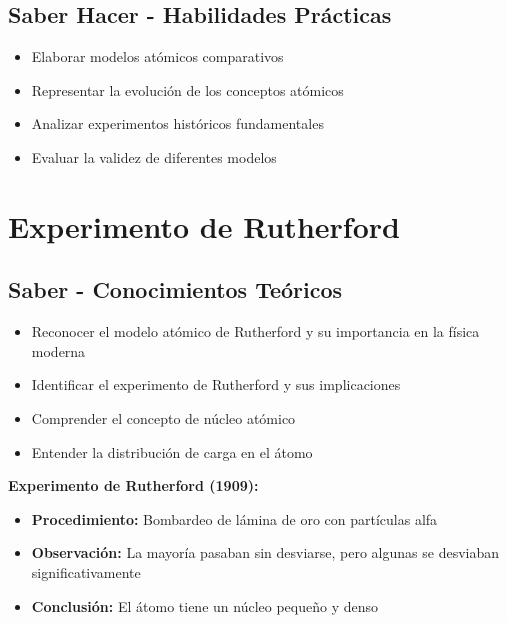 \documentclass[12pt,a4paper,twoside]{book}
\begin{document}
	\subsection{Saber Hacer - Habilidades Prácticas}
	\begin{hacerbox}
		\begin{itemize}
			\item Elaborar modelos atómicos comparativos
			\item Representar la evolución de los conceptos atómicos
			\item Analizar experimentos históricos fundamentales
			\item Evaluar la validez de diferentes modelos
		\end{itemize}
	\end{hacerbox}
	
	\section{Experimento de Rutherford}
	\label{sec:experimento_rutherford}
	
	\subsection{Saber - Conocimientos Teóricos}
	\begin{saberbox}
		\begin{itemize}
			\item Reconocer el modelo atómico de Rutherford y su importancia en la física moderna
			\item Identificar el experimento de Rutherford y sus implicaciones
			\item Comprender el concepto de núcleo atómico
			\item Entender la distribución de carga en el átomo
		\end{itemize}
	\end{saberbox}
	
	\begin{experimentobox}
		\textbf{Experimento de Rutherford (1909):}
		\begin{itemize}
			\item \textbf{Procedimiento:} Bombardeo de lámina de oro con partículas alfa
			\item \textbf{Observación:} La mayoría pasaban sin desviarse, pero algunas se desviaban significativamente
			\item \textbf{Conclusión:} El átomo tiene un núcleo pequeño y denso
		\end{itemize}
	\end{experimentobox}
	
\end{document}
